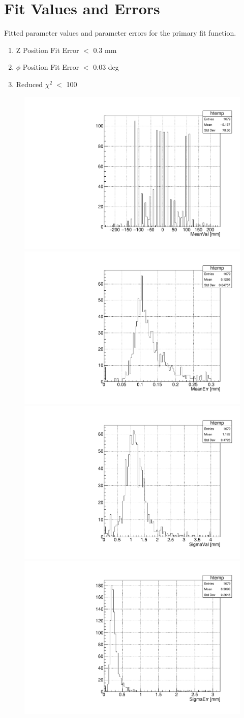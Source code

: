 \appendix

\section{Fit Values and Errors}
Fitted parameter values and parameter errors for the primary fit 
function. 

\begin{enumerate}
    \item Z Position Fit Error $<$ 0.3 mm
    \item $\phi$ Position Fit Error $<$ 0.03 deg
    \item Reduced $\chi ^{2} \; <$ 100
\end{enumerate}


\begin{figure}[h]
    \centering
    \includegraphics[width=.4\linewidth]{plots/2018/ZMeanVal.pdf}
    \includegraphics[width=.4\linewidth]{plots/2018/ZMeanErr.pdf}\\
    \includegraphics[width=.4\linewidth]{plots/2018/ZSigmaVal.pdf}
    \includegraphics[width=.4\linewidth]{plots/2018/ZSigmaErr.pdf}\\

\end{figure}
